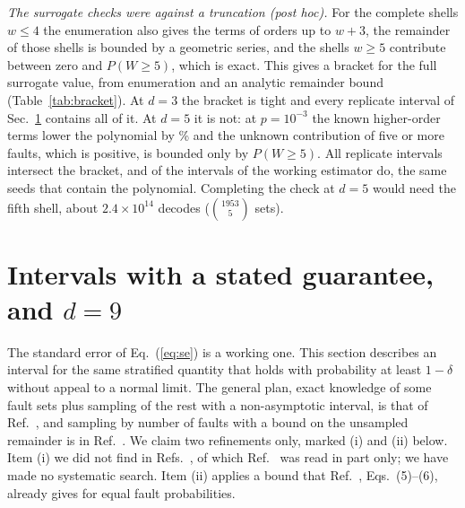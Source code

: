 \documentclass[aps,pre,onecolumn,superscriptaddress,nofootinbib,10pt]{revtex4-2}
\begin{document}
\emph{The surrogate checks were against a truncation (post hoc).} For the complete shells $w\le4$ the enumeration also gives the terms of orders up to $w+3$, the remainder of those shells is bounded by a geometric series, and the shells $w\ge5$ contribute between zero and $P(W\ge5)$, which is exact. This gives a bracket for the full surrogate value, from enumeration and an analytic remainder bound (Table~\ref{tab:bracket}). At $d=3$ the bracket is tight and every replicate interval of Sec.~\ref{sec:cert} contains all of it. At $d=5$ it is not: at $p=10^{-3}$ the known higher-order terms lower the polynomial by \% and the unknown contribution of five or more faults, which is positive, is bounded only by $P(W\ge5)$. All  replicate intervals intersect the bracket, and  of the  intervals of the working estimator do, the same seeds that contain the polynomial. Completing the check at $d=5$ would need the fifth shell, about $2.4\times10^{14}$ decodes ($\binom{1953}{5}$ sets).
\begin{table}[htbp]
\caption{Bracket for the full value of the surrogate, against its polynomial through fourth order, and the number of replicate intervals of Sec.~\ref{sec:cert} that contain the whole bracket. Post hoc.}\label{tab:bracket}
\footnotesize
\end{table}

\section{Intervals with a stated guarantee, and $d=9$}\label{sec:cert}
The standard error of Eq.~(\ref{eq:se}) is a working one. This section describes an interval for the same stratified quantity that holds with probability at least $1-\delta$ without appeal to a normal limit. The general plan, exact knowledge of some fault sets plus sampling of the rest with a non-asymptotic interval, is that of Ref.~\cite{molavi2026}, and sampling by number of faults with a bound on the unsampled remainder is in Ref.~\cite{heussen2024}. We claim two refinements only, marked (i) and (ii) below. Item (i) we did not find in Refs.~\cite{heussen2024,beverland2025,ye2026,molavi2026}, of which Ref.~\cite{heussen2024} was read in part only; we have made no systematic search. Item (ii) applies a bound that Ref.~\cite{heussen2024}, Eqs.~(5)--(6), already gives for equal fault probabilities.
\end{document}
